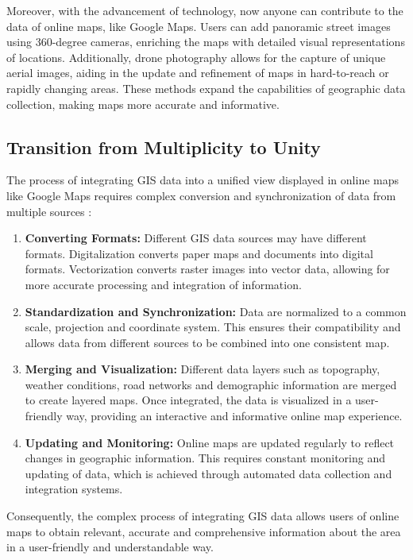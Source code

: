 \documentclass[10pt,oneside,english,a4paper]{article}
\begin{document}
Moreover, with the advancement of technology, now anyone can contribute to the data of online maps, like Google Maps. Users can add panoramic street images using 360-degree cameras, enriching the maps with detailed visual representations of locations. Additionally, drone photography allows for the capture of unique aerial images, aiding in the update and refinement of maps in hard-to-reach or rapidly changing areas. These methods expand the capabilities of geographic data collection, making maps more accurate and informative.

\subsection {Transition from Multiplicity to Unity} \label{data:integrating}
The process of integrating GIS data into a unified view displayed in online maps like Google Maps requires complex conversion and synchronization of data from multiple sources \cite{Demers2008}:

\begin{enumerate}
\item \textbf{Converting Formats:} Different GIS data sources may have different formats. Digitalization converts paper maps and documents into digital formats. Vectorization converts raster images into vector data, allowing for more accurate processing and integration of information.

\item \textbf{Standardization and Synchronization:} Data are normalized to a common scale, projection and coordinate system. This ensures their compatibility and allows data from different sources to be combined into one consistent map.

\item \textbf{Merging and Visualization:} Different data layers such as topography, weather conditions, road networks and demographic information are merged to create layered maps. Once integrated, the data is visualized in a user-friendly way, providing an interactive and informative online map experience.

\item \textbf{Updating and Monitoring:} Online maps are updated regularly to reflect changes in geographic information. This requires constant monitoring and updating of data, which is achieved through automated data collection and integration systems.
\end{enumerate}

Consequently, the complex process of integrating GIS data allows users of online maps to obtain relevant, accurate and comprehensive information about the area in a user-friendly and understandable way.
\end{document}
